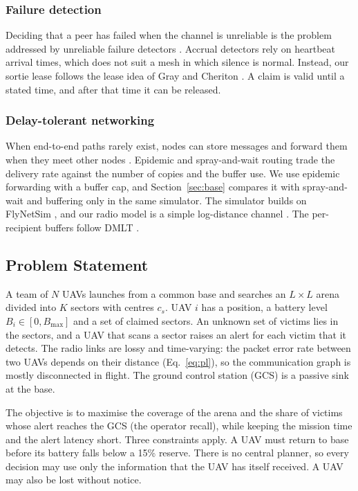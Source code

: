 \documentclass[10pt,a4paper,twocolumn]{article}
\begin{document}
\subsubsection{Failure detection}
Deciding that a peer has failed when the channel is unreliable is the problem addressed by unreliable failure detectors \cite{chandra1996}. Accrual detectors \cite{hayashibara2004} rely on heartbeat arrival times, which does not suit a mesh in which silence is normal. Instead, our sortie lease follows the lease idea of Gray and Cheriton \cite{gray1989}. A claim is valid until a stated time, and after that time it can be released.

\subsubsection{Delay-tolerant networking}
When end-to-end paths rarely exist, nodes can store messages and forward them when they meet other nodes \cite{fall2003dtn}. Epidemic and spray-and-wait routing \cite{vahdat2000epidemic,spyropoulos2005spray} trade the delivery rate against the number of copies and the buffer use. We use epidemic forwarding with a buffer cap, and Section~\ref{sec:base} compares it with spray-and-wait and buffering only in the same simulator. The simulator builds on FlyNetSim \cite{baidya2018flynetsim}, and our radio model is a simple log-distance channel \cite{rappaport2002wireless}. The per-recipient buffers follow DMLT \cite{kosaka2023dmlt}.

\subsection{Problem Statement}\label{sec:problem}
A team of $N$ UAVs launches from a common base and searches an $L\times L$ arena divided into $K$ sectors with centres $c_s$. UAV $i$ has a position, a battery level $B_i\in[0,B_{\max}]$ and a set of claimed sectors. An unknown set of victims lies in the sectors, and a UAV that scans a sector raises an alert for each victim that it detects. The radio links are lossy and time-varying: the packet error rate between two UAVs depends on their distance (Eq.~\ref{eq:pl}), so the communication graph is mostly disconnected in flight. The ground control station (GCS) is a passive sink at the base.

The objective is to maximise the coverage of the arena and the share of victims whose alert reaches the GCS (the operator recall), while keeping the mission time and the alert latency short. Three constraints apply. A UAV must return to base before its battery falls below a 15\% reserve. There is no central planner, so every decision may use only the information that the UAV has itself received. A UAV may also be lost without notice.
\end{document}
